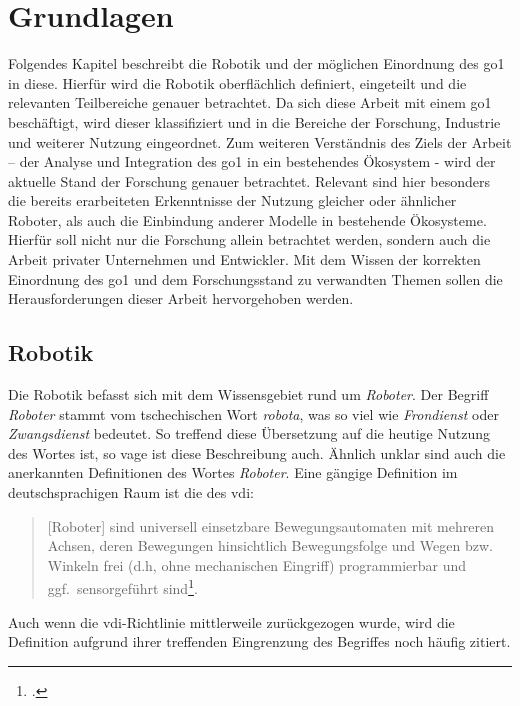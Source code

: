 \section{Grundlagen}
\label{sec:grundlagen}
Folgendes Kapitel beschreibt die Robotik und der möglichen Einordnung des \gls{go1} in diese.
Hierfür wird die Robotik oberflächlich definiert, eingeteilt und die relevanten Teilbereiche genauer betrachtet.
Da sich diese Arbeit mit einem \gls{go1} beschäftigt, wird dieser klassifiziert und in die Bereiche der Forschung, Industrie und weiterer Nutzung eingeordnet.
Zum weiteren Verständnis des Ziels der Arbeit -- der Analyse und Integration des \gls{go1} in ein bestehendes Ökosystem -
wird der aktuelle Stand der Forschung genauer betrachtet.
Relevant sind hier besonders die bereits erarbeiteten Erkenntnisse der Nutzung gleicher oder ähnlicher Roboter, als auch
die Einbindung anderer Modelle in bestehende Ökosysteme.
Hierfür soll nicht nur die Forschung allein betrachtet werden, sondern auch die Arbeit privater Unternehmen und Entwickler.
Mit dem Wissen der korrekten Einordnung des \gls{go1} und dem Forschungsstand zu verwandten Themen sollen die Herausforderungen dieser
Arbeit hervorgehoben werden.

\subsection{Robotik}
\label{subsec:robotik}

Die Robotik befasst sich mit dem Wissensgebiet rund um \emph{Roboter}.
Der Begriff \emph{Roboter} stammt vom tschechischen Wort \emph{robota}, was so viel wie \emph{Frondienst} oder \emph{Zwangsdienst} bedeutet.
So treffend diese Übersetzung auf die heutige Nutzung des Wortes ist, so vage ist diese Beschreibung auch.
Ähnlich unklar sind auch die anerkannten Definitionen des Wortes \emph{Roboter}.
Eine gängige Definition im deutschsprachigen Raum ist die des \gls{vdi}:

\begin{quote}
[Roboter]
    sind universell einsetzbare Bewegungsautomaten mit mehreren Achsen,
    deren Bewegungen hinsichtlich Bewegungsfolge und Wegen bzw.
    Winkeln frei (d.h, ohne mechanischen Eingriff) programmierbar und ggf.~sensorgeführt sind\footcite{vdi_2860}.
\end{quote}

\noindent Auch wenn die \gls{vdi}-Richtlinie mittlerweile zurückgezogen wurde, wird die Definition aufgrund ihrer treffenden Eingrenzung
des Begriffes noch häufig zitiert.


